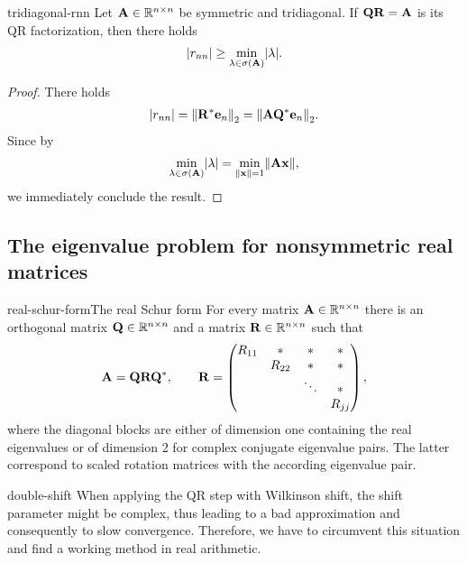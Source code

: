 \begin{Lemma}{tridiagonal-rnn}
  Let $\mathbf A\in\mathbb R^{n\times n}$ be symmetric and tridiagonal. If
  $\mathbf Q\mathbf R=\mathbf A$ is its QR factorization, then there holds
  \begin{gather}
    \lvert r_{nn}\rvert \ge \min_{\lambda\in\sigma(\mathbf A)} \lvert\lambda\rvert.
  \end{gather}
\end{Lemma}

\begin{proof}
  There holds
  \begin{gather}
    \abs*{r_{nn}} = \norm*{\matr^*\ve_n}_2 = \norm*{\mata\matq^*\ve_n}_2.
  \end{gather}
  Since by 
  \begin{gather}
    \min_{\lambda\in\sigma(\mata)}\abs*{\lambda}
    = \min_{\norm{\vx}=1} \norm{\mata\vx},
  \end{gather}
  we immediately conclude the result.
\end{proof}
  
\subsection{The eigenvalue problem for nonsymmetric real matrices}

\begin{Theorem*}{real-schur-form}{The real Schur form}
  For every matrix $\mathbf A\in \mathbb R^{n\times n}$ there is an orthogonal matrix
  $\mathbf Q\in\mathbb R^{n\times n}$ and a matrix $\mathbf R\in\mathbb R^{n\times n}$ such that
  \begin{gather}
    \mathbf A = \mathbf Q\mathbf R\mathbf Q^*,
    \qquad
    \mathbf R =
    \begin{pmatrix}
      R_{11} &* & *&*\\
      &R_{22}&*&*\\
      &&\ddots&*\\
      &&& R_{jj}
    \end{pmatrix},
  \end{gather}
  where the diagonal blocks are either of dimension one containing the
  real eigenvalues or of dimension 2 for complex conjugate eigenvalue
  pairs. The latter correspond to scaled rotation matrices with the
  according eigenvalue pair.
\end{Theorem*}

\begin{intro}{double-shift}
  When applying the QR step with Wilkinson shift, the shift parameter
  might be complex, thus leading to a bad approximation and
  consequently to slow convergence. Therefore, we have to circumvent
  this situation and find a working method in real arithmetic.
\end{intro}

